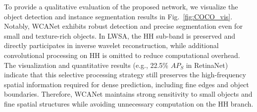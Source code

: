 \documentclass[a4paper,fleqn]{cas-dc}
\begin{document}
{ \color{green}
  To provide a qualitative evaluation of the proposed network, we visualize the object detection and instance segmentation results in Fig.~\ref{fig:COCO_vis}. Notably, WCANet exhibits robust detection and precise segmentation even for small and texture-rich objects. In LWSA, the HH sub-band is preserved and directly participates in inverse wavelet reconstruction, while additional convolutional processing on HH is omitted to reduce computational overhead. The visualization and quantitative results (e.g., 22.5\% $AP_S$ in RetinaNet) indicate that this selective processing strategy still preserves the high-frequency spatial information required for dense prediction, including fine edges and object boundaries. Therefore, WCANet maintains strong sensitivity to small objects and fine spatial structures while avoiding unnecessary computation on the HH branch.
}








\end{document}

